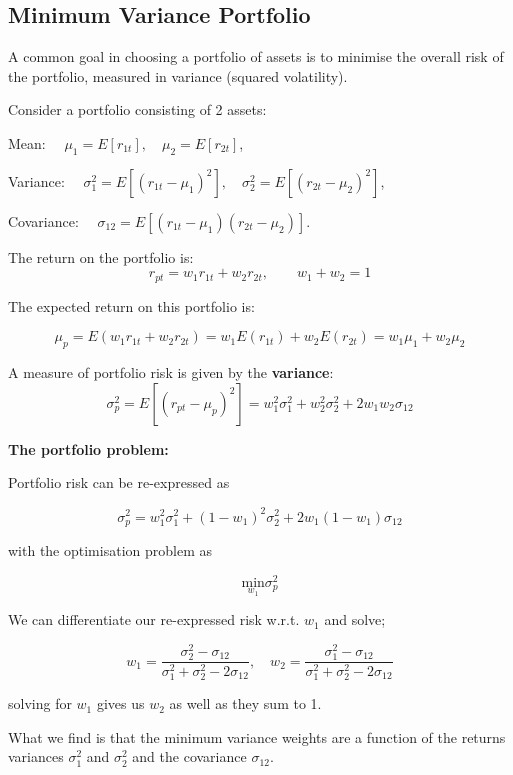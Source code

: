 \documentclass[11pt]{article}
\begin{document}
\subsection{Minimum Variance Portfolio}

A common goal in choosing a portfolio of assets is to minimise the overall risk of the portfolio, measured in variance (squared volatility).

Consider a portfolio consisting of 2 assets:
\begin{shaded}
    

Mean: $\quad \mu_1=E\left[r_{1 t}\right], \quad \mu_2=E\left[r_{2 t}\right]$,

Variance: $\quad \sigma_1^2=E\left[\left(r_{1 t}-\mu_1\right)^2\right], \quad \sigma_2^2=E\left[\left(r_{2 t}-\mu_2\right)^2\right]$,

Covariance: $\quad \sigma_{12}=E\left[\left(r_{1 t}-\mu_1\right)\left(r_{2 t}-\mu_2\right)\right]$.

The return on the portfolio is:
\[r_{pt} = w_1r_{1t} + w_2 r_{2t}, \qquad w_1 + w_2 = 1\]

The expected return on this portfolio is:

\begin{equation}
\mu_p=E\left(w_1 r_{1 t}+w_2 r_{2 t}\right)=w_1 E\left(r_{1 t}\right)+w_2 E\left(r_{2 t}\right)=w_1 \mu_1+w_2 \mu_2
\end{equation}

A measure of portfolio risk is given by the \textbf{variance}:
\begin{equation}
\sigma_p^2=E\left[\left(r_{p t}-\mu_p\right)^2\right]=w_1^2 \sigma_1^2+w_2^2 \sigma_2^2+2 w_1 w_2 \sigma_{12}
\end{equation}
\end{shaded}

\begin{mdframed}
    \textbf{The portfolio problem:}

    Portfolio risk can be re-expressed as

    \begin{equation}
\sigma_p^2=w_1^2 \sigma_1^2+\left(1-w_1\right)^2 \sigma_2^2+2 w_1\left(1-w_1\right) \sigma_{12}
\end{equation}

with the optimisation problem as

\[\underset{w_1}{\text{min}}\sigma_p^2\]

We can differentiate our re-expressed risk w.r.t. $w_1$ and solve;

\begin{equation}
w_1=\frac{\sigma_2^2-\sigma_{12}}{\sigma_1^2+\sigma_2^2-2 \sigma_{12}}, \quad w_2=\frac{\sigma_1^2-\sigma_{12}}{\sigma_1^2+\sigma_2^2-2 \sigma_{12}}
\end{equation}

solving for $w_1$ gives us $w_2$ as well as they sum to 1.

What we find is that the minimum variance weights are a function of the returns variances $\sigma_1^2$ and $\sigma_2^2$ and the covariance $\sigma_{12}$.
\end{mdframed}
\end{document}
